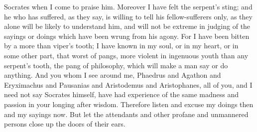 Socrates when I come to praise him. Moreover I have felt the serpent's sting; and he who has suffered, as they say, is willing to tell his fellow-sufferers only, as they alone will be likely to understand him, and will not be extreme in judging of the sayings or doings which have been wrung from his agony. For I have been bitten by a more than viper's tooth; I have known in my soul, or in my heart, or in some other part, that worst of pangs, more violent in ingenuous youth than any serpent's tooth, the pang of philosophy, which will make a man say or do anything. And you whom I see around me, Phaedrus and Agathon and Eryximachus and Pausanias and Aristodemus and Aristophanes, all of you, and I need not say Socrates himself, have had experience of the same madness and passion in your longing after wisdom. Therefore listen and excuse my doings then and my sayings now. But let the attendants and other profane and unmannered persons close up the doors of their ears.

